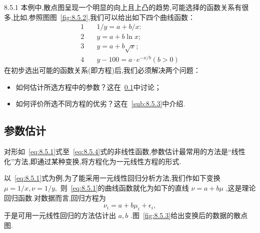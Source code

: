 \begin{example}{}{8.5.1}
	本例中,散点图呈现一个明显的向上且上凸的趋势,可能选择的函数关系有很多,比如,参照图图~\ref{fig:8.5.2},我们可以给出如下四个曲线函数：
	\begin{align}
	1 &\quad 1 / y=a+b / x : \\ 
	2  &\quad  y=a+b \ln x ;  \\ 
	3  &\quad  y=a+b \sqrt{x} ;  \\ 
	4  &\quad  y-100=a \cdot e^{-x / b}(b>0)
	\end{align}
	在初步选出可能的函数关系(即方程)后,我们必须解决两个问题：
	\begin{itemize}
		\item 如何估计所选方程中的参数？这在~\ref{sub:8.5.2}中讨论；
		\item 如何评价所选不同方程的优劣？这在~\ref{sub:8.5.3}中介绍.
	\end{itemize}
\end{example}

\subsection{参数估计}\label{sub:8.5.2}

对形如~\ref{eq:8.5.1}式至~\ref{eq:8.5.4}式的非线性函数,参数估计最常用的方法是“线性化”方法,即通过某种变换,将方程化为一元线性方程的形式.

以~\ref{eq:8.5.1}式为例,为了能采用一元线性回归分析方法,我们作如下变换
$ \mu =1/x,\nu =1/y, $ 
则~\ref{eq:8.5.1}的曲线函数就化为如下的直线 $ \nu=a+b\mu  $ ,这是理论回归函数.对数据而言,回归方程为
\[
\nu_i=a+b\mu_i+\epsilon_i,
\]
于是可用一元线性回归的方法估计出 $ a,b $ .图~\ref{fig:8.5.3}给出变换后的数据的散点图.

